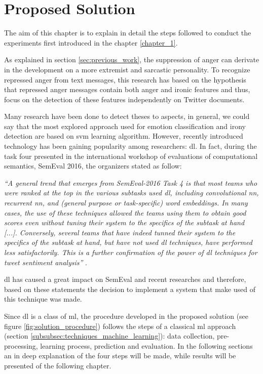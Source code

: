 \chapter{Proposed Solution}
\label{proposed_solution}

The aim of this chapter is to explain in detail the steps followed to conduct the experiments first introduced in the chapter \ref{chapter_1}.

As explained in section \ref{sec:previous_work}, the suppression of anger can derivate in the development on a more extremist and sarcastic personality. To recognize repressed anger from text messages, this research has based on the hypothesis that repressed anger messages contain both anger and ironic features and thus, focus on the detection of these features independently on Twitter documents.

Many research have been done to detect theses to aspects, in general, we could say that the most explored approach used for emotion classification and irony detection are based on \acrshort{svm} learning algorithm. However, recently introduced technology has been gaining popularity among researchers: \acrshort{dl}. In fact, during the task four presented in the international workshop of evaluations of computational semantics, SemEval 2016, the organizers stated as follow:

\textit{``A general trend that emerges from SemEval-2016 Task 4 is that most teams who were ranked at the top in the various subtasks used \acrlong{dl}, including convolutional \acrshort{nn}, recurrent \acrshort{nn}, and (general purpose or task-specific) word embeddings. In many cases, the use of these techniques allowed the teams using them to obtain good scores even without tuning their system to the specifics of the subtask at hand [...]. Conversely, several teams that have indeed tunned their system to the specifics of the subtask at hand, but have not used \acrlong{dl} techniques, have performed less satisfactorily. This is a further confirmation of the power of \acrlong{dl} techniques for tweet sentiment analysis''} \cite{nakov2016semeval}.

\acrshort{dl} has caused a great impact on SemEval and recent researches and therefore, based on these statements the decision to implement a system that make used of this technique was made.

Since \acrshort{dl} is a class of \acrshort{ml}, the procedure developed in the proposed solution (see figure \ref{fig:solution_procedure}) follows the steps of a classical \acrlong{ml} approach (section \ref{subsubsec:techniques_machine_learning}): data collection, pre-processing, learning process, prediction and evaluation. In the following sections an in deep explanation of the four steps will be made, while results will be presented of the following chapter.

